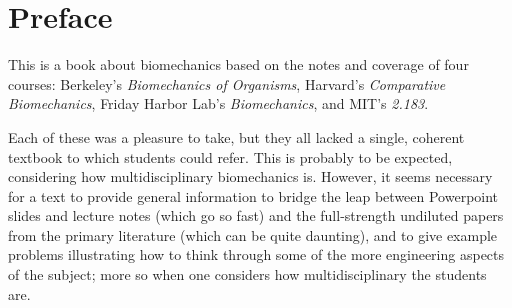 
\chapter*{Preface}





This is a book about biomechanics based on the notes and coverage of four courses:  Berkeley's \emph{Biomechanics of Organisms}, Harvard's \emph{Comparative Biomechanics}, Friday Harbor Lab's \emph{Biomechanics}, and MIT's \emph{2.183}.  

Each of these was a pleasure to take, but they all lacked a single, coherent textbook to which students could refer.  This is probably to be expected, considering how multidisciplinary biomechanics is.  However, it seems necessary for a text to provide general information to bridge the leap between Powerpoint slides and lecture notes (which go so fast) and the full-strength undiluted papers from the primary literature (which can be quite daunting), and to give example problems illustrating how to think through some of the more engineering aspects of the subject; more so when one considers how multidisciplinary the students are.

